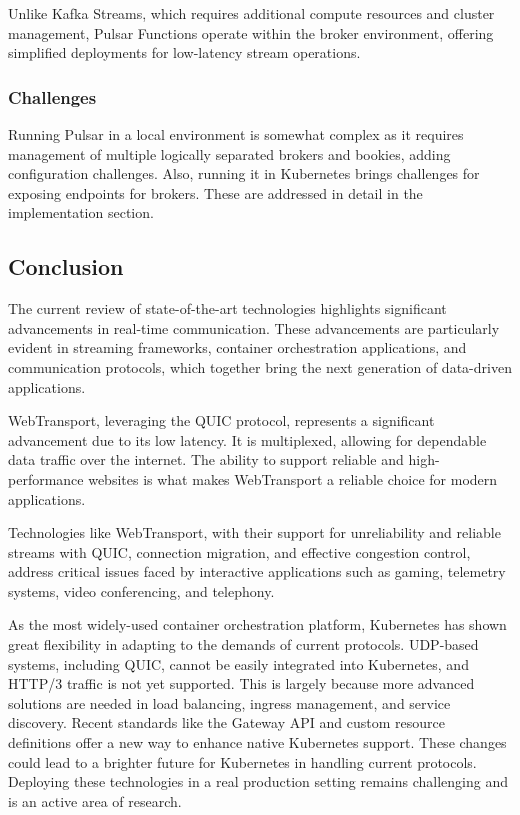 Unlike Kafka Streams, which requires additional compute resources and cluster management, Pulsar Functions operate within the broker environment, offering simplified deployments for low-latency stream operations.

\subsubsection{Challenges}
Running Pulsar in a local environment is somewhat complex as it requires management of multiple logically separated brokers and bookies, adding configuration challenges. Also, running it in Kubernetes brings challenges for exposing endpoints for brokers. These are addressed in detail in the implementation section.

\subsection{Conclusion}

The current review of state-of-the-art technologies highlights significant advancements in real-time communication. These advancements are particularly evident in streaming frameworks, container orchestration applications, and communication protocols, which together bring the next generation of data-driven applications.

WebTransport, leveraging the QUIC protocol, represents a significant advancement due to its low latency. It is multiplexed, allowing for dependable data traffic over the internet. The ability to support reliable and high-performance websites is what makes WebTransport a reliable choice for modern applications.

Technologies like WebTransport, with their support for unreliability and reliable streams with QUIC, connection migration, and effective congestion control, address critical issues faced by interactive applications such as gaming, telemetry systems, video conferencing, and telephony.

As the most widely-used container orchestration platform, Kubernetes has shown great flexibility in adapting to the demands of current protocols. UDP-based systems, including QUIC, cannot be easily integrated into Kubernetes, and HTTP/3 traffic is not yet supported. This is largely because more advanced solutions are needed in load balancing, ingress management, and service discovery. Recent standards like the Gateway API and custom resource definitions offer a new way to enhance native Kubernetes support. These changes could lead to a brighter future for Kubernetes in handling current protocols. Deploying these technologies in a real production setting remains challenging and is an active area of research.

